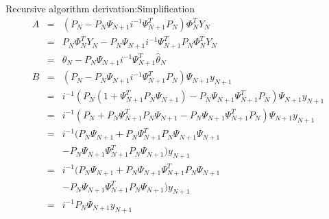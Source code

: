 \bgroup
{}
\begin{frame}{Recursive algorithm derivation:Simplification}
\begin{eqnarray*}
A &=& (P_N -P_N\Psi_{N+1}i^{-1}\Psi_{N+1}^T P_N )\Phi_N^T Y_N\\
&=& P_N\Phi_N^T Y_N -P_N\Psi_{N+1}i^{-1}\Psi_{N+1}^T P_N \Phi_N^T Y_N\\
&=& \hat\theta_N-P_N\Psi_{N+1}i^{-1}\Psi_{N+1}^T \hat\theta_N\\
B &=& (P_N -P_N\Psi_{N+1}i^{-1}\Psi_{N+1}^T P_N )\Psi_{N+1}y_{N+1}\\
&=& i^{-1}(P_N(1+\Psi_{N+1}^T P_N \Psi_{N+1}) -P_N\Psi_{N+1}\Psi_{N+1}^T P_N )\Psi_{N+1}y_{N+1}\\
&=& i^{-1}(P_N+P_N\Psi_{N+1}^T P_N \Psi_{N+1} -P_N\Psi_{N+1}\Psi_{N+1}^T P_N )\Psi_{N+1}y_{N+1}\\
&=& i^{-1}(P_N\Psi_{N+1}+P_N\Psi_{N+1}^T P_N \Psi_{N+1}\Psi_{N+1} \\
&&  -P_N\Psi_{N+1}\Psi_{N+1}^T P_N \Psi_{N+1})y_{N+1}\\
&=& i^{-1}(P_N\Psi_{N+1}+P_N\Psi_{N+1}\Psi_{N+1}^T P_N \Psi_{N+1} \\
&& -P_N\Psi_{N+1}\Psi_{N+1}^T P_N \Psi_{N+1})y_{N+1}\\
&=& i^{-1}P_N\Psi_{N+1}y_{N+1}
\end{eqnarray*}
\end{frame}
\egroup

